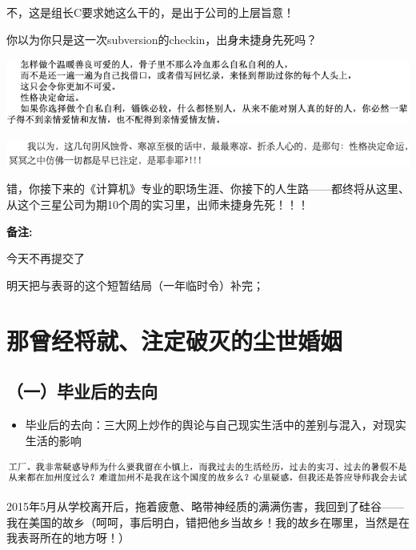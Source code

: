 \documentclass[9pt, b5paper]{article}
\begin{document}
不，这是组长C要求她这么干的，是出于公司的上层旨意！

你以为你只是这一次subversion的checkin，出身未捷身先死吗？

\begin{center}
\includegraphics[width=.9\linewidth]{./pic/backups_plans_20210413_131623.png}
\end{center}

\begin{center}
\includegraphics[width=.9\linewidth]{./pic/backups_plans_20210505_140554.png}
\end{center}

错，你接下来的《计算机》专业的职场生涯、你接下的人生路——都终将从这里、从这个三星公司为期10个周的实习里，出师未捷身先死！！！

\textbf{备注:} 

今天不再提交了

明天把与表哥的这个短暂结局（一年临时令）补完；


\section{那曾经将就、注定破灭的尘世婚姻}
\label{sec:org9f0eebb}

\subsection{（一）毕业后的去向}
\label{sec:orgd667a4d}

\begin{itemize}
\item 毕业后的去向：三大网上炒作的舆论与自己现实生活中的差别与混入，对现实生活的影响
\end{itemize}

\begin{center}
\includegraphics[width=.9\linewidth]{./pic/backups_plans_20210426_095826.png}
\end{center}

2015年5月从学校离开后，拖着疲惫、略带神经质的满满伤害，我回到了硅谷——我在美国的故乡（呵呵，事后明白，错把他乡当故乡！我的故乡在哪里，当然是在我表哥所在的地方呀！）
\end{document}
